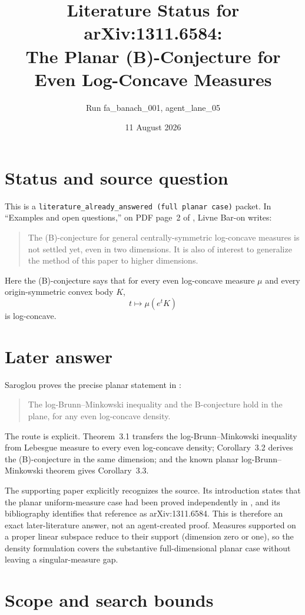 \documentclass[11pt]{article}
\title{Literature Status for arXiv:1311.6584:\\
The Planar (B)-Conjecture for Even Log-Concave Measures}
\author{Run fa\_banach\_001, agent\_lane\_05}
\date{11 August 2026}
\begin{document}
\maketitle

\section*{Status and source question}

This is a \texttt{literature\_already\_answered (full planar case)} packet.
In ``Examples and open questions,'' on PDF page~2 of \cite{Livne}, Livne
Bar-on writes:
\begin{quote}
The (B)-conjecture for general centrally-symmetric log-concave measures is not
settled yet, even in two dimensions. It is also of interest to generalize the
method of this paper to higher dimensions.
\end{quote}
Here the (B)-conjecture says that for every even log-concave measure \(\mu\)
and every origin-symmetric convex body \(K\),
\[
 t\longmapsto \mu(e^tK)
\]
is log-concave.

\section*{Later answer}

Saroglou proves the precise planar statement in
\cite[Corollary~3.3, PDF p.~5]{Saroglou}:
\begin{quote}
The log-Brunn--Minkowski inequality and the B-conjecture hold in the plane, for
any even log-concave density.
\end{quote}
The route is explicit.  Theorem~3.1 transfers the log-Brunn--Minkowski
inequality from Lebesgue measure to every even log-concave density;
Corollary~3.2 derives the (B)-conjecture in the same dimension; and the known
planar log-Brunn--Minkowski theorem gives Corollary~3.3.

The supporting paper explicitly recognizes the source.  Its introduction
states that the planar uniform-measure case had been proved independently in
\cite{Livne}, and its bibliography identifies that reference as
arXiv:1311.6584.  This is therefore an exact later-literature answer, not an
agent-created proof.  Measures supported on a proper linear subspace reduce to
their support (dimension zero or one), so the density formulation covers the
substantive full-dimensional planar case without leaving a singular-measure
gap.

\section*{Scope and search bounds}
\end{document}
